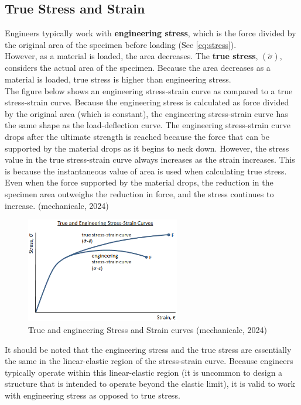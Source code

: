 \documentclass{article}
\begin{document}
    \subsection{True Stress and Strain}
    Engineers typically work with \textbf{engineering stress}, which is the force divided by the original area of the specimen before loading (See \ref{eq:stress}).\\[8pt] However, as a material is loaded, the area decreases. The \textbf{true stress}, $(\tilde{\sigma})$, considers the actual area of the specimen. Because the area decreases as a material is loaded, true stress is higher than engineering stress.\\[8pt]
    The figure below shows an engineering stress-strain curve as compared to a true stress-strain curve. Because the engineering stress is calculated as force divided by the original area (which is constant), the engineering stress-strain curve has the same shape as the load-deflection curve. The engineering stress-strain curve drops after the ultimate strength is reached because the force that can be supported by the material drops as it begins to neck down. However, the stress value in the true stress-strain curve always increases as the strain increases. This is because the instantaneous value of area is used when calculating true stress. Even when the force supported by the material drops, the reduction in the specimen area outweighs the reduction in force, and the stress continues to increase. (mechanicalc, 2024)    
    \begin{figure}[H]
        \centering
        \includegraphics[width=0.6\textwidth]{images/true-stress-strain-diagram-01.png}
        \caption{True and engineering Stress and Strain curves (mechanicalc, 2024)}
        \label{fig:tvn}
    \end{figure}
    It should be noted that the engineering stress and the true stress are essentially the same in the linear-elastic region of the stress-strain curve. Because engineers typically operate within this linear-elastic region (it is uncommon to design a structure that is intended to operate beyond the elastic limit), it is valid to work with engineering stress as opposed to true stress.\\[8pt]
\end{document}

